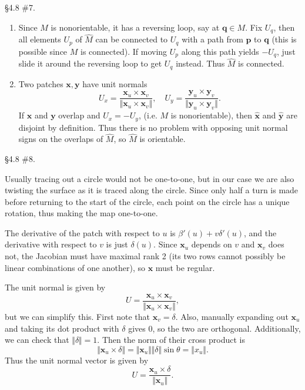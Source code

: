 \documentclass[10pt]{report}
\begin{document}
\begin{exer}[]
\S 4.8 \#7.
\end{exer}
\begin{enumerate}
	\item Since $M$ is nonorientable, it has a reversing loop, say at $\mathbf{q} \in M$. Fix $U_{q}$, then all elements $U_{p}$ of $\hat{M}$ can be connected to $U_{q}$ with a path from $\mathbf{p}$ to $\mathbf{q}$ (this is possible since $M$ is connected). If moving $U_{p}$ along this path yields $-U_{q}$, just slide it around the reversing loop to get $U_{q}$ instead. Thus $\hat{M}$ is connected.

	\item Two patches $\mathbf{x}, \mathbf{y}$ have unit normals
		\[
		U_{x}= \frac{\mathbf{x}_{u}\times \mathbf{x}_{v}}{{\Vert{\mathbf{x}_{u} \times \mathbf{x}_{v}}\Vert}} , \quad U_{y}= \frac{\mathbf{y}_{u}\times \mathbf{y}_{v}}{{\Vert{\mathbf{y}_{u} \times \mathbf{y}_{v}}\Vert}}.
	\] If $\mathbf{x}$ and $\mathbf{y}$ overlap and $U_{x}=-U_{y}$, (i.e. $M$ is nonorientable), then $\hat{\mathbf{x}}$ and $\hat{\mathbf{y}}$ are disjoint by definition. Thus there is no problem with opposing unit normal signs on the overlaps of $\hat{M}$, so $\hat{M}$ is orientable.
\end{enumerate}

\begin{exer}[]
\S 4.8 \#8.
\end{exer}
Usually tracing out a circle would not be one-to-one, but in our case we are also twisting the surface as it is traced along the circle. Since only half a turn is made before returning to the start of the circle, each point on the circle has a unique rotation, thus making the map one-to-one.

The derivative of the patch with respect to $u$ is $\beta'(u) + v\delta'(u)$, and the derivative with respect to $v$ is just $\delta(u)$. Since $\mathbf{x}_{u}$ depends on $v$ and $\mathbf{x}_{v}$ does not, the Jacobian must have maximal rank 2 (its two rows cannot possibly be linear combinations of one another), so $\mathbf{x}$ must be regular.

The unit normal is given by
\[
U = \frac{\mathbf{x}_{u}\times \mathbf{x}_{v}}{{\Vert{\mathbf{x}_{u} \times \mathbf{x}_{v}}\Vert}},
\] but we can simplify this. First note that $\mathbf{x}_{v} = \delta$. Also, manually expanding out $\mathbf{x}_{u}$ and taking its dot product with $\delta$ gives 0, so the two are orthogonal. Additionally, we can check that ${\Vert{\delta}\Vert}=1$. Then the norm of their cross product is
\[
{\Vert{\mathbf{x}_{u}\times \delta}\Vert} = {\Vert{\mathbf{x}_{u}}\Vert}{\Vert{\delta}\Vert}\sin \theta = {\Vert{x_{u}}\Vert}.
\] Thus the unit normal vector is given by
\[
U = \frac{\mathbf{x}_{u}\times \delta}{{\Vert{\mathbf{x}_{u}}\Vert}} .
\] 
\end{document}
